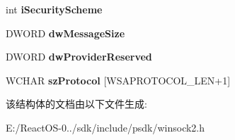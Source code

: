 \begin{DoxyCompactItemize}
int {\bfseries i\+Security\+Scheme}
\item 
\mbox{\label{struct___w_s_a_p_r_o_t_o_c_o_l___i_n_f_o_w_a3b247313409c0fd7fb52df60169d27db}} 
D\+W\+O\+RD {\bfseries dw\+Message\+Size}
\item 
\mbox{\label{struct___w_s_a_p_r_o_t_o_c_o_l___i_n_f_o_w_a8e38edca62308cc6e7e1a817bedbbfc2}} 
D\+W\+O\+RD {\bfseries dw\+Provider\+Reserved}
\item 
\mbox{\label{struct___w_s_a_p_r_o_t_o_c_o_l___i_n_f_o_w_a0d76268e5f6640d1a2be5a43974b0278}} 
W\+C\+H\+AR {\bfseries sz\+Protocol} \mbox{[}W\+S\+A\+P\+R\+O\+T\+O\+C\+O\+L\+\_\+\+L\+EN+1\mbox{]}
\end{DoxyCompactItemize}


该结构体的文档由以下文件生成\+:\begin{DoxyCompactItemize}
\item 
E\+:/\+React\+O\+S-\/0../sdk/include/psdk/winsock2.\+h\end{DoxyCompactItemize}
